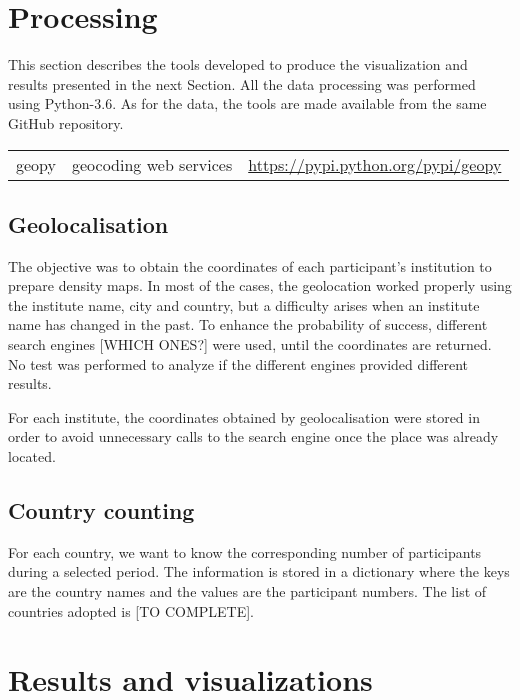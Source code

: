 \documentclass[12pt,a4paper,oneside,final]{article}
\begin{document}
\section{Processing}
This section describes the tools developed to produce the visualization and results presented in the next Section. 
All the data processing was performed using Python-3.6. As for the data, the tools are made available from the same GitHub repository.


\begin{tabular}{ccc}
geopy		& 	geocoding web services		& 	\url{https://pypi.python.org/pypi/geopy}	\\
\end{tabular}	

\subsection{Geolocalisation}

The objective was to obtain the coordinates of each participant's institution to prepare density maps. In most of the cases, the geolocation worked properly using the institute name, city and country, but a difficulty arises when an institute name has changed in the past. To enhance the probability of success, different search engines [WHICH ONES?] were used, until the coordinates are returned. No test was performed to analyze if the different engines provided different results.

For each institute, the coordinates obtained by geolocalisation were stored in order to avoid unnecessary calls to the search engine once the place was already located.

\subsection{Country counting}

For each country, we want to know the corresponding number of participants during a selected period. The information is stored in a dictionary where the keys are the country names and the values are the participant numbers. The list of countries adopted is [TO COMPLETE].


\section{Results and visualizations}
\end{document}
